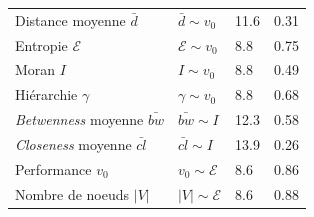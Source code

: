 \begin{table}
{\begin{tabular}{|l|l|l|l|}
Distance moyenne $\bar{d}$ & $\bar{d} \sim v_0$ & 11.6 & 0.31 \\
Entropie $\mathcal{E}$  & $\mathcal{E} \sim v_0$ &  8.8  &0.75 \\
Moran $I$ & $I \sim v_0$ & 8.8 & 0.49 \\
Hiérarchie $\gamma$ & $\gamma \sim v_0$ & 8.8  & 0.68 \\\hline
\emph{Betwenness} moyenne $\bar{bw}$ & $\bar{bw} \sim I$ & 12.3 & 0.58 \\
\emph{Closeness} moyenne $\bar{cl}$ & $\bar{cl}\sim I$ & 13.9 & 0.26 \\
Performance $v_0$ & $v_0 \sim \mathcal{E}$ & 8.6  & 0.86 \\
Nombre de noeuds $\left|V\right|$ & $\left|V\right| \sim \mathcal{E}$ & 8.6  & 0.88 \\\hline
\end{tabular}
}
\end{table}







